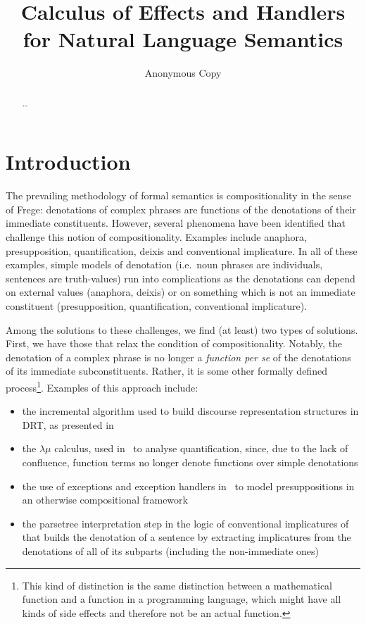 \documentclass{llncs}
\begin{document}
%
\title{Calculus of Effects and Handlers \\ for Natural Language Semantics}
%
\author{Anonymous Copy}
%

\maketitle              %

\begin{abstract}
\dots
\keywords{\dots}
\end{abstract}
%

\section{Introduction}
\label{sec:introduction}

The prevailing methodology of formal semantics is compositionality in the
sense of Frege: denotations of complex phrases are functions of the
denotations of their immediate constituents. However, several phenomena
have been identified that challenge this notion of
compositionality. Examples include anaphora, presupposition,
quantification, deixis and conventional implicature. In all of these
examples, simple models of denotation (i.e.\ noun phrases are individuals,
sentences are truth-values) run into complications as the denotations can
depend on external values (anaphora, deixis) or on something which is not
an immediate constituent (presupposition, quantification, conventional
implicature).

Among the solutions to these challenges, we find (at least) two types of
solutions. First, we have those that relax the condition of
compositionality. Notably, the denotation of a complex phrase is no longer
a \emph{function per se} of the denotations of its immediate
subconstituents. Rather, it is some other formally defined
process\footnote{This kind of distinction is the same distinction between a
  mathematical function and a function in a programming language, which
  might have all kinds of side effects and therefore not be an actual
  function.}. Examples of this approach include:

\begin{itemize}
\item the incremental algorithm used to build discourse representation
  structures in DRT, as presented in~\cite{kamp1993discourse}
\item the $\lambda\mu$ calculus, used in~\cite{de2001type} to analyse
  quantification, since, due to the lack of confluence, function terms no
  longer denote functions over simple denotations
\item the use of exceptions and exception handlers
  in~\cite{lebedeva2012expression} to model presuppositions in an otherwise
  compositional framework
\item the parsetree interpretation step in the logic of conventional
  implicatures of~\cite{potts2005logic} that builds the denotation of a
  sentence by extracting implicatures from the denotations of all of its
  subparts (including the non-immediate ones)
\end{itemize}
\end{document}
